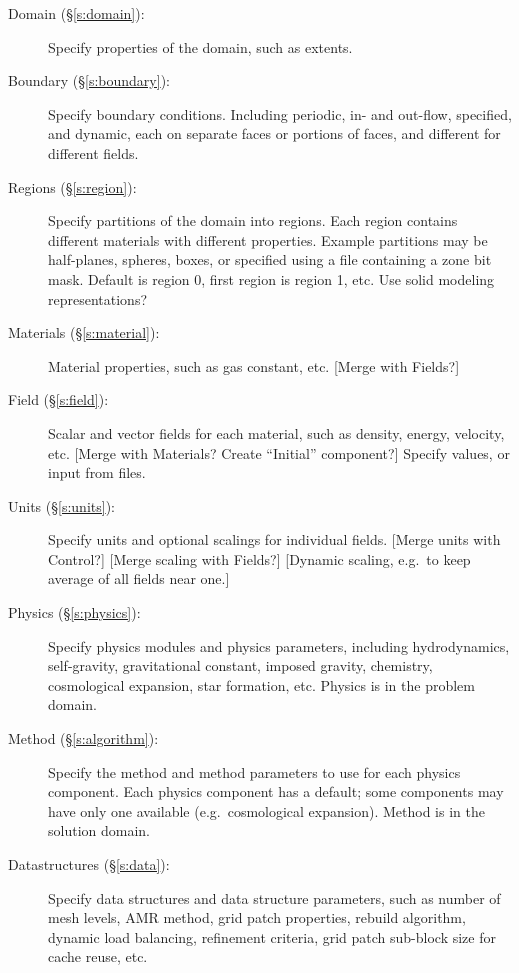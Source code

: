 \documentclass{book}
\begin{document}
\begin{description}

 \item [Domain (\S\ref{s:domain}): ] Specify properties of the domain, such as extents.

 \item [Boundary (\S\ref{s:boundary}): ] Specify boundary conditions.
 Including periodic, in- and out-flow, specified, and dynamic, each on
 separate faces or portions of faces, and different for different
 fields.

 \item [Regions (\S\ref{s:region}): ] Specify partitions of the domain
 into regions.  Each region contains different materials with
 different properties.  Example partitions may be half-planes,
 spheres, boxes, or specified using a file containing a zone bit mask.
 Default is region 0, first region is region 1, etc.  Use solid
 modeling representations?

 \item [Materials (\S\ref{s:material}): ] Material properties, such as
 gas constant, etc.  [Merge with Fields?]

 \item [Field (\S\ref{s:field}): ] Scalar and vector fields for each
 material, such as density, energy, velocity, etc.  [Merge with
 Materials?  Create ``Initial'' component?]  Specify values, or input
 from files.

 \item [Units (\S\ref{s:units}): ] Specify units and optional scalings
 for individual fields.  [Merge units with Control?] [Merge scaling
 with Fields?] [Dynamic scaling, e.g.~to keep average of all fields
 near one.]

 \item [Physics (\S\ref{s:physics}): ] Specify physics modules and
 physics parameters, including hydrodynamics, self-gravity,
 gravitational constant, imposed gravity, chemistry, cosmological
 expansion, star formation, etc.  Physics is in the problem domain.

 \item [Method (\S\ref{s:algorithm}): ] Specify the method and
 method parameters to use for each physics component.  Each physics
 component has a default; some components may have only one available
 (e.g.~cosmological expansion).  Method is in the solution domain.

 \item [Datastructures (\S\ref{s:data}): ] Specify data structures and data structure
 parameters, such as number of mesh levels, AMR method, grid patch
 properties, rebuild algorithm, dynamic load balancing, refinement
 criteria, grid patch sub-block size for cache reuse, etc.


\end{description}
\end{document}
